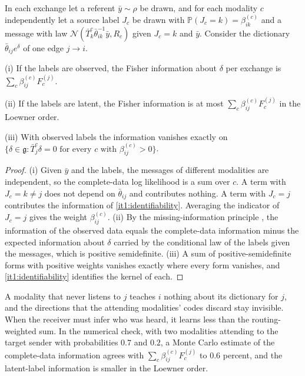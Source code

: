 \documentclass[11pt,letterpaper]{report}
\begin{document}
In each exchange let a referent $\bar y\sim\rho$ be drawn, and for each modality $c$ independently let a source label $J_c$ be drawn with $\mathbb P(J_c=k)=\beta^{(c)}_{ik}$ and a message with law $\mathcal N(\bar T_k^c\bar\theta_{ik}^{-1}\bar y,R_c)$ given $J_c=k$ and $\bar y$. Consider the dictionary $\bar\theta_{ij}e^{\delta}$ of one edge $j\to i$.

\textup{(i)} If the labels are observed, the Fisher information about $\delta$ per exchange is $\sum_c\beta^{(c)}_{ij}F_c^{(j)}$.

\textup{(ii)} If the labels are latent, the Fisher information is at most $\sum_c\beta^{(c)}_{ij}F_c^{(j)}$ in the Loewner order.

\textup{(iii)} With observed labels the information vanishes exactly on $\{\delta\in\mathfrak g:\bar T_j^c\delta=0\text{ for every }c\text{ with }\beta^{(c)}_{ij}>0\}$.
\begin{proof}
(i) Given $\bar y$ and the labels, the messages of different modalities are independent, so the complete-data log likelihood is a sum over $c$. A term with $J_c=k\neq j$ does not depend on $\bar\theta_{ij}$ and contributes nothing. A term with $J_c=j$ contributes the information of \cref{it1:identifiability}. Averaging the indicator of $J_c=j$ gives the weight $\beta^{(c)}_{ij}$. (ii) By the missing-information principle \citep{Louis1982}, the information of the observed data equals the complete-data information minus the expected information about $\delta$ carried by the conditional law of the labels given the messages, which is positive semidefinite. (iii) A sum of positive-semidefinite forms with positive weights vanishes exactly where every form vanishes, and \cref{it1:identifiability} identifies the kernel of each.
\end{proof}

A modality that never listens to $j$ teaches $i$ nothing about its dictionary for $j$, and the directions that the attending modalities' codes discard stay invisible. When the receiver must infer who was heard, it learns less than the routing-weighted sum. In the numerical check, with two modalities attending to the target sender with probabilities $0.7$ and $0.2$, a Monte Carlo estimate of the complete-data information agrees with $\sum_c\beta^{(c)}_{ij}F_c^{(j)}$ to $0.6$ percent, and the latent-label information is smaller in the Loewner order.
\end{document}
